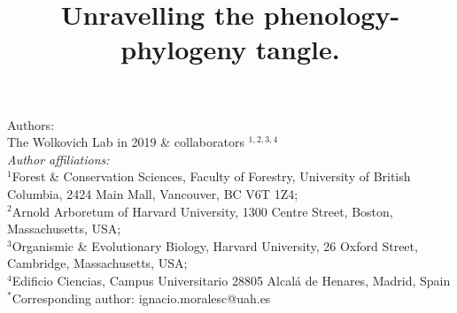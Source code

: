 \documentclass{article}\usepackage[]{graphicx}\usepackage[]{color}
\title{Unravelling the phenology-phylogeny tangle.}
\begin{document}
\maketitle

\noindent Authors:\\
The Wolkovich Lab in 2019 \& collaborators $^{1,2,3,4}$ %
\vspace{2ex}\\
\emph{Author affiliations:}\\
$^{1}$Forest \& Conservation Sciences, Faculty of Forestry, University of British Columbia, 2424 Main Mall, Vancouver, BC V6T 1Z4;\\
$^{2}$Arnold Arboretum of Harvard University, 1300 Centre Street, Boston, Massachusetts, USA;\\
$^{3}$Organismic \& Evolutionary Biology, Harvard University, 26 Oxford Street, Cambridge, Massachusetts, USA;\\
$^{4}$Edificio Ciencias, Campus Universitario 28805 Alcalá de Henares, Madrid, Spain\\
 

\vspace{2ex}
$^*$Corresponding author: ignacio.moralesc@uah.es\\
\renewcommand{\thetable}{\arabic{table}}
\renewcommand{\thefigure}{\arabic{figure}}
\renewcommand{\labelitemi}{$-$}

\clearpage
\end{document}

